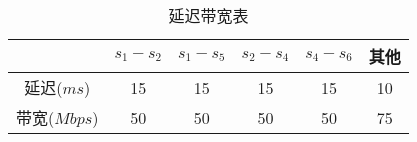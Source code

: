 \begin{table}

\centering
\begin{tabular}{cccccc}
  \toprule
  & $s_1 - s_2 $ & $ s_1 - s_5 $ & $s_2-s_4$ & $s_4-s_6$ & 其他 \\
  \midrule
  延迟($ms$) & 15 & 15 & 15 & 15 & 10 \\
  带宽($Mbps$) & 50 & 50 & 50 & 50 & 75 \\
  \bottomrule
\end{tabular}
\caption{延迟带宽表}
\end{table}